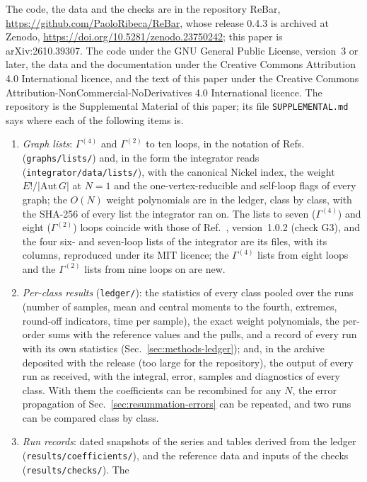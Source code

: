 The code, the data and the checks are in the repository ReBar, \url{https://github.com/PaoloRibeca/ReBar},
whose release 0.4.3 is archived at Zenodo, \url{https://doi.org/10.5281/zenodo.23750242}; this paper is
arXiv:2610.39307. The
code under the GNU General Public License, version~3 or later, the data and the documentation under the Creative
Commons Attribution 4.0 International licence, and the text of this paper under the Creative Commons
Attribution-NonCommercial-NoDerivatives 4.0 International licence. The repository is the Supplemental Material of this paper; its file
\texttt{SUPPLEMENTAL.md} says where each of the following items is.
\begin{enumerate}
\item \emph{Graph lists}: $\Gamma^{(4)}$ and $\Gamma^{(2)}$ to ten loops, in the notation of
Refs.~\cite{Ribeca2003thesis,GuidaRibeca2006} (\texttt{graphs/lists/}) and, in the form the integrator reads
(\texttt{integrator/data/lists/}), with the canonical Nickel index, the weight $E!/|\mathrm{Aut}\,G|$ at $N=1$ and
the one-vertex-reducible and self-loop flags of every graph; the $O(N)$ weight polynomials are in the ledger, class by
class, with the SHA-256 of every list the integrator ran on. The lists to seven ($\Gamma^{(4)}$) and eight
($\Gamma^{(2)}$) loops coincide with those of Ref.~\cite{Phi4tools2024}, version~1.0.2 (check G3), and the four
six- and seven-loop lists of the integrator are its files, with its columns, reproduced under its MIT licence; the
$\Gamma^{(4)}$ lists from eight loops and the $\Gamma^{(2)}$ lists from nine loops on are new.
\item \emph{Per-class results} (\texttt{ledger/}): the statistics of every class pooled over the runs (number of
samples, mean and central moments to the fourth, extremes, round-off indicators, time per sample), the exact weight
polynomials, the per-order sums with the reference values and the pulls, and a record of every run with its own
statistics (Sec.~\ref{sec:methods-ledger}); and, in the archive deposited with the release (too large for the
repository), the output of every run as received, with the integral, error, samples and diagnostics of every class. With them the coefficients can be recombined for any $N$, the error propagation of
Sec.~\ref{sec:resummation-errors} can be repeated, and two runs can be compared class by class.
\item \emph{Run records}: dated snapshots of the series and tables derived from the ledger
(\texttt{results/coefficients/}), and the reference data and inputs of the checks (\texttt{results/checks/}). The

\end{enumerate}
